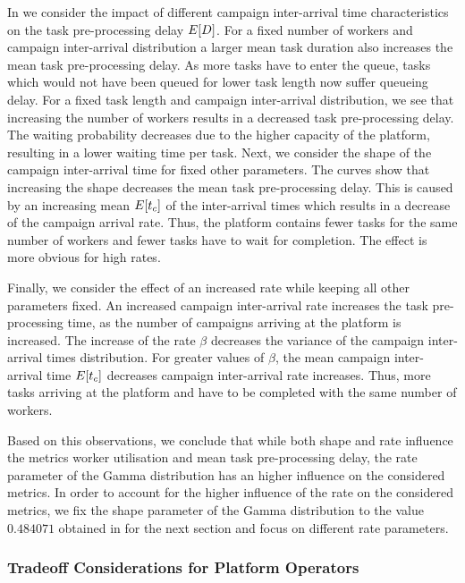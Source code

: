 In  we consider the impact of different campaign inter-arrival time characteristics on the task pre-processing delay \(E[D]\).
For a fixed number of workers and campaign inter-arrival distribution a larger mean task duration also increases the mean task pre-processing delay. 
As more tasks have to enter the queue, tasks which would not have been queued for lower task length now suffer queueing delay.
For a fixed task length and campaign inter-arrival distribution, we see that increasing the number of workers results in a decreased task pre-processing delay.
The waiting probability decreases due to the higher capacity of the platform, resulting in a lower waiting time per task.
Next, we consider the shape of the campaign inter-arrival time for fixed other parameters. 
The curves show that increasing the shape decreases the mean task pre-processing delay. 
This is caused by an increasing mean \(E[t_c]\) of the inter-arrival times which results in a decrease of the campaign arrival rate.
Thus, the platform contains fewer tasks for the same number of workers and fewer tasks have to wait for completion.
The effect is more obvious for high rates.

Finally, we consider the effect of an increased rate while keeping all other parameters fixed.
An increased campaign inter-arrival rate increases the task pre-processing time, as the number of campaigns arriving at the platform is increased.
The increase of the rate \(\beta\) decreases the variance of the campaign inter-arrival times distribution.
For greater values of \(\beta\), the mean campaign inter-arrival time \(E[t_c]\) decreases campaign inter-arrival rate increases. 
Thus, more tasks arriving at the platform and have to be completed with the same number of workers.

Based on this observations, we conclude that while both shape and rate influence the metrics worker utilisation and mean task pre-processing delay, the rate parameter of the Gamma distribution has an higher influence on the considered metrics.
In order to account for the higher influence of the rate on the considered metrics, we fix the shape parameter of the Gamma distribution to the value \(0.484071\) obtained in  for the next section and focus on different rate parameters.

\subsubsection*{Tradeoff Considerations for Platform Operators}

